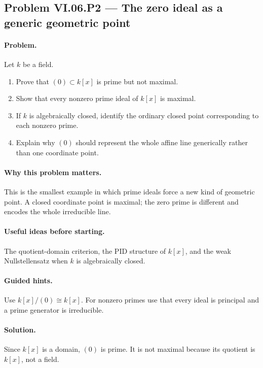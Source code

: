 \subsection*{Problem VI.06.P2 --- The zero ideal as a generic geometric point}
\label{prob:vi-06-p2}

\paragraph{Problem.}
Let \(k\) be a field.
\begin{enumerate}
\item Prove that \((0)\subset k[x]\) is prime but not maximal.
\item Show that every nonzero prime ideal of \(k[x]\) is maximal.
\item If \(k\) is algebraically closed, identify the ordinary closed point corresponding
to each nonzero prime.
\item Explain why \((0)\) should represent the whole affine line generically rather than
one coordinate point.
\end{enumerate}

\ifdefined\FullProblemDossiers
\paragraph{Why this problem matters.}
This is the smallest example in which prime ideals force a new kind of geometric point.  A
closed coordinate point is maximal; the zero prime is different and encodes the whole
irreducible line.

\paragraph{Useful ideas before starting.}
The quotient-domain criterion, the PID structure of \(k[x]\), and the weak Nullstellensatz
when \(k\) is algebraically closed.

\paragraph{Guided hints.}
Use \(k[x]/(0)\cong k[x]\).  For nonzero primes use that every ideal is principal and a
prime generator is irreducible.

\paragraph{Solution.}
Since \(k[x]\) is a domain, \((0)\) is prime.  It is not maximal because its quotient is
\(k[x]\), not a field.

